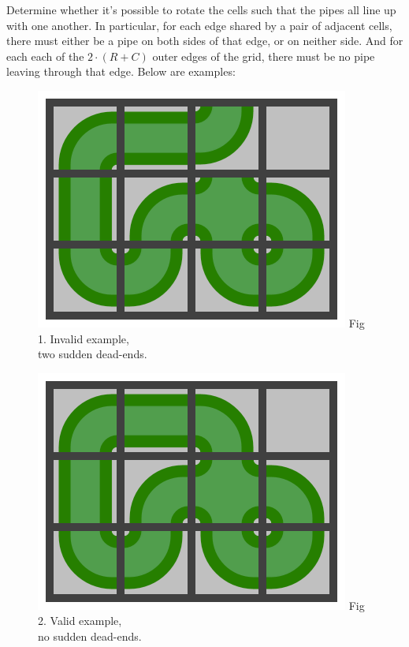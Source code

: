 Determine whether it's possible to rotate the cells such that the pipes all line up with one another. In particular, for each edge shared by a pair of adjacent cells, there must either be a pipe on both sides of that edge, or on neither side. And for each each of the $2 \cdot (R + C)$ outer edges of the grid, there must be no pipe leaving through that edge. Below are examples:

\begin{figure}[h]
  \centering
  \begin{minipage}[t]{0.3\textwidth}\centering
      \includegraphics[width=\textwidth]{pipe_rotation_2}
      Fig 1. Invalid example,\\ two sudden dead-ends.
  \end{minipage}
  \hspace{30pt}
  \begin{minipage}[t]{0.3\textwidth}\centering
      \includegraphics[width=\textwidth]{pipe_rotation_3}
      Fig 2. Valid example,\\ no sudden dead-ends.
  \end{minipage}
\end{figure}

